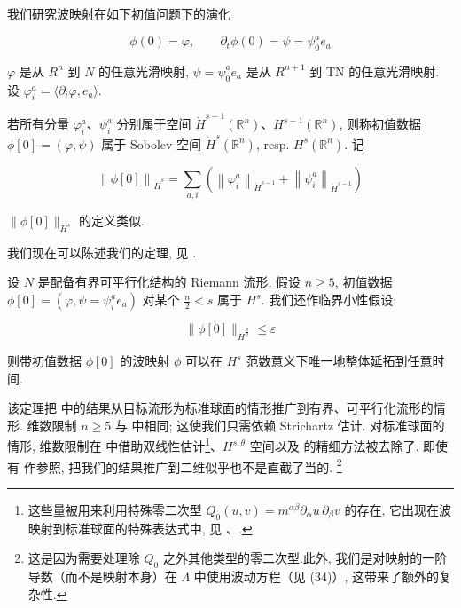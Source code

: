 我们研究波映射在如下初值问题下的演化

\begin{equation}
\phi (0) = \varphi ,  \qquad \partial_ {t} \phi (0) = \psi = \psi_ {0} ^ {a} e _ {a}\label{eq:cG-36}
\end{equation}

$\varphi$ 是从 $R^{n}$ 到 $N$ 的任意光滑映射, $\psi = \psi_{0}^{a}e_{a}$ 是从 $R^{n+1}$ 到 TN 的任意光滑映射. 设 $\varphi_{i}^{a} = \langle\partial_{i}\varphi,  e_{a}\rangle$. 

\begin{definition}\label{def:cG-2.15}
若所有分量 $\varphi_i^a$、$\psi_i^a$ 分别属于空间 $\dot{H}^{s-1}(\mathbb{R}^n)$、$H^{s-1}(\mathbb{R}^n)$, 则称初值数据 $\phi[0] = (\varphi,  \psi)$ 属于 Sobolev 空间 $\dot{H}^s(\mathbb{R}^n)$, resp. $H^s(\mathbb{R}^n)$. 记

\[
\left\| \phi [ 0 ] \right\| _ {\dot {H} ^ {s}} = \sum_ {a,  i} \left(\left\| \varphi_ {i} ^ {a} \right\| _ {\dot {H} ^ {s - 1}} + \left\| \psi_ {i} ^ {a} \right\| _ {\dot {H} ^ {s - 1}}\right)
\]

$\| \phi [0]\|_{H^s}$ 的定义类似. 
\end{definition}

我们现在可以陈述我们的定理, 见 \cite{gfref41}. 

\begin{theorem}\label{thm:cG-2.16}
设 $N$ 是配备有界可平行化结构的 Riemann 流形. 假设 $n \geq 5$, 初值数据 $\phi[0] = (\varphi,  \psi = \psi_{i}^{a} e_{a})$ 对某个 $\frac{n}{2} < s$ 属于 $H^{s}$. 我们还作临界小性假设:

\[
\| \phi [ 0 ] \| _ {\dot {H} ^ {\frac {n}{2}}} \leq \varepsilon
\]

则带初值数据 $\phi[0]$ 的波映射 $\phi$ 可以在 $H^{s}$ 范数意义下唯一地整体延拓到任意时间. 
\end{theorem}

\begin{remark}\label{rem:cG-2.17}
该定理把 \cite{gfref70} 中的结果从目标流形为标准球面的情形推广到有界、可平行化流形的情形. 维数限制 $n \geq 5$ 与 \cite{gfref70} 中相同; 这使我们只需依赖 Strichartz 估计. 对标准球面的情形,   维数限制在 \cite{gfref71} 中借助双线性估计\footnote{这些量被用来利用特殊零二次型 $Q_0(u, v)=m^{\alpha\beta}\partial_\alpha u\, \partial_\beta v$ 的存在, 它出现在波映射到标准球面的特殊表达式中,  见 \cite{gfref70}、\cite{gfref71}.}、$H^{s, \theta}$ 空间以及 \cite{gfref73} 的精细方法被去除了. 即使有 \cite{gfref71} 作参照, 把我们的结果推广到二维似乎也不是直截了当的. \footnote{这是因为需要处理除 $Q_0$ 之外其他类型的零二次型.此外,  我们是对映射的一阶导数（而不是映射本身）在 $\Lambda$ 中使用波动方程（见 (34)）, 这带来了额外的复杂性.}
\end{remark}

